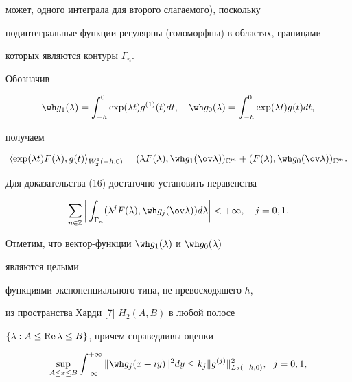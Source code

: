 может, одного интеграла для второго слагаемого), поскольку 


подинтегральные функции регулярны (голоморфны) в областях, границами 


которых являются контуры $\Gamma_n$. 


 


Обозначив 


$$ 


\wh g_1(\lambda)=\int^0_{-h}\exp(\lambda t) 


g^{(1)}(t)dt,\quad \wh g_0(\lambda)=\int^0_{-h} 


\exp(\lambda t)g(t)dt, 


$$ 


получаем 


$$ 


\langle\exp(\lambda t)F(\lambda),g(t) 


\rangle_{W^1_2(-h,0)}=(\lambda F(\lambda),\wh g_1 


(\ov\lambda))_{\Bbb C^m}+(F(\lambda),\wh g_0 


(\ov\lambda))_{\Bbb C^m}. 


$$ 


 


Для доказательства (16) достаточно установить неравенства 


$$ 


\sum_{n\in \Bbb Z}\bigg|\int_{\Gamma_n}(\lambda^j F(\lambda), 


\wh g_j(\ov \lambda))d\lambda\bigg|<+\infty,\quad 


j=0,1. 


$$ 


Отметим, что вектор-функции $\wh g_1(\lambda)$ и $\wh g_0(\lambda)$ 


являются целыми 


функциями экспоненциального типа, не превосходящего $h$, 


из пространства Харди [7] $H_2(A,B)$ в любой полосе 


$\{\lambda:A\le\operatorname{Re}\lambda\le B\}$, причем справедливы оценки 


\begin{equation} 


\sup_{A\le x\le B}\int^{+\infty}_{-\infty} 


\|\wh g_j(x+i y)\|^2dy\le k_j\|g^{(j)}\|^2_{L_2(-h,0)},\ \; j=0,1,


\end{equation} 


